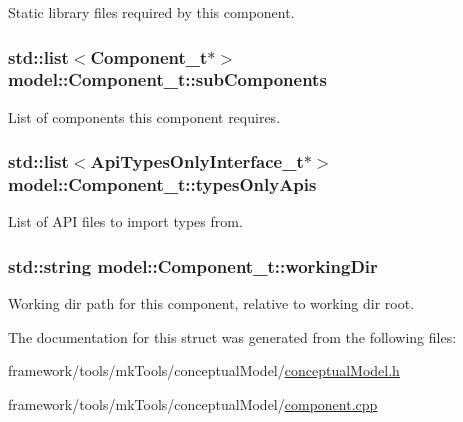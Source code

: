 Static library files required by this component. 

\subsubsection[{\texorpdfstring{sub\+Components}{subComponents}}]{\setlength{\rightskip}{0pt plus 5cm}std\+::list$<${\bf Component\+\_\+t}$\ast$$>$ model\+::\+Component\+\_\+t\+::sub\+Components}\hypertarget{structmodel_1_1_component__t_aee49d6a29c34707c7d895596be91b448}{}\label{structmodel_1_1_component__t_aee49d6a29c34707c7d895596be91b448}


List of components this component requires. 

\subsubsection[{\texorpdfstring{types\+Only\+Apis}{typesOnlyApis}}]{\setlength{\rightskip}{0pt plus 5cm}std\+::list$<${\bf Api\+Types\+Only\+Interface\+\_\+t}$\ast$$>$ model\+::\+Component\+\_\+t\+::types\+Only\+Apis}\hypertarget{structmodel_1_1_component__t_a13b72cb57487a6881cc8d7e20a66f6d8}{}\label{structmodel_1_1_component__t_a13b72cb57487a6881cc8d7e20a66f6d8}


List of A\+PI files to import types from. 

\subsubsection[{\texorpdfstring{working\+Dir}{workingDir}}]{\setlength{\rightskip}{0pt plus 5cm}std\+::string model\+::\+Component\+\_\+t\+::working\+Dir}\hypertarget{structmodel_1_1_component__t_a8f3ef590b81796c76fba28b24b623e40}{}\label{structmodel_1_1_component__t_a8f3ef590b81796c76fba28b24b623e40}


Working dir path for this component, relative to working dir root. 



The documentation for this struct was generated from the following files\+:\begin{DoxyCompactItemize}
\item 
framework/tools/mk\+Tools/conceptual\+Model/\hyperlink{conceptual_model_8h}{conceptual\+Model.\+h}\item 
framework/tools/mk\+Tools/conceptual\+Model/\hyperlink{component_8cpp}{component.\+cpp}\end{DoxyCompactItemize}
